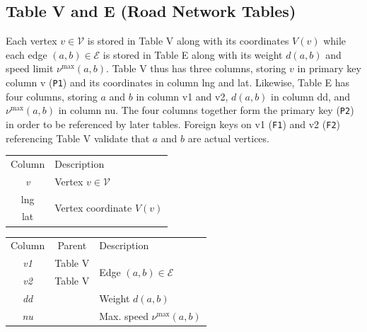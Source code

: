 \subsection{Table V and E (Road Network Tables)}
Each vertex $v\in\mathcal{V}$ is stored in Table V along with its coordinates
$V(v)$ while each edge $(a,b)\in\mathcal{E}$ is stored in Table E along with
its weight $d(a,b)$ and speed limit $\nu^\textrm{max}(a,b)$.  Table V thus has
three columns, storing $v$ in primary key column \textsf{v} ({\tt{}P1}) and its
coordinates in column \textsf{lng} and \textsf{lat}.  Likewise, Table E has
four columns, storing $a$ and $b$ in column \textsf{v1} and \textsf{v2},
$d(a,b)$ in column \textsf{dd}, and $\nu^\textrm{max}(a,b)$ in column
\textsf{nu}.  The four columns together form the primary key ({\tt{}P2}) in order
to be referenced by later tables.  Foreign keys on \textsf{v1} ({\tt{}F1}) and
\textsf{v2} ({\tt{}F2}) referencing Table V validate that $a$ and $b$ are actual
vertices.
\begin{table}[h]
\centering
\small
\begin{tabular}{|c|l|}
\hline
\rowcolor{TableTitle}
\multicolumn{2}{|c|}{Table V (Vertices)}\\
\hline
\rowcolor{TableHeader}
Column & Description\\
\hline
\textit{v} & Vertex $v\in\mathcal{V}$\\
\hline
lng & \multirow{2}{*}{Vertex coordinate $V(v)$}\\
lat & \\
\hline
\end{tabular}
\begin{tabular}{|c|c|l|}
\hline
\rowcolor{TableTitle}
\multicolumn{3}{|c|}{Table E (Edges)}\\
\hline
\rowcolor{TableHeader}
Column & Parent & Description\\
\hline
\textit{v1} & Table V & \multirow{2}{*}{Edge $(a, b)\in\mathcal{E}$} \\
\cline{2-2}
\textit{v2} & Table V & \\
\hline
\textit{dd} & & Weight $d(a,b)$\\
\hline
\textit{nu} & & Max. speed $\nu^\textrm{max}(a,b)$\\
\hline
\end{tabular}
\end{table}
\nwenddocs{}\endmoddef{}
